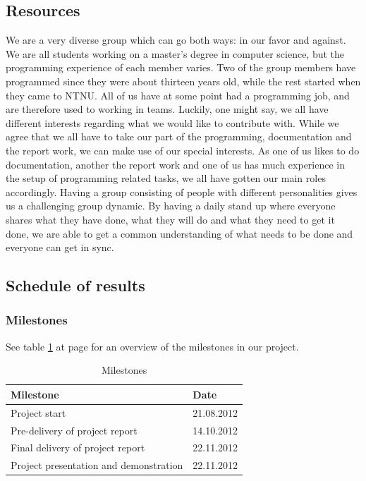 \subsection{Resources}
We are a very diverse group which can go both ways: in our favor and against. We are all students working on a master's degree in computer science, but the programming experience of each member varies. Two of the group members have
programmed since they were about thirteen years old, while the rest started when they came to NTNU. All of us have at some point had a programming job, and are therefore used to working in teams.
\newline
\newline
Luckily, one might say, we all have different interests regarding what we would like to contribute with. While we agree that we all have to take our part of the programming, documentation and the report work, we can make use of our special interests. As one of us likes to do documentation, another the report work and one of us has much experience in the setup of programming related tasks, we all have gotten our main roles accordingly.
\newline
\newline
Having a group consisting of people with different personalities gives us a challenging group dynamic. By having a daily stand up where everyone shares what they have done, what they will do and what they need to get it done, we are able to get a common understanding of what needs to be done and everyone can get in sync.

\subsection{Schedule of results}

\subsubsection*{Milestones}
See table \ref{tab:milestones} at page \pageref{tab:milestones} for an overview of the milestones in our project.
\begin{table}
\begin{tabular}{l|l} \hline
\textbf{Milestone} & \textbf{Date} \\ \hline \hline
Project start &  21.08.2012\\ 
Pre-delivery of project report & 14.10.2012\\ 
Final delivery of project report & 22.11.2012\\
Project presentation and demonstration & 22.11.2012\\ \hline
\end{tabular}
\caption{Milestones} \label{tab:milestones}
\end{table}

